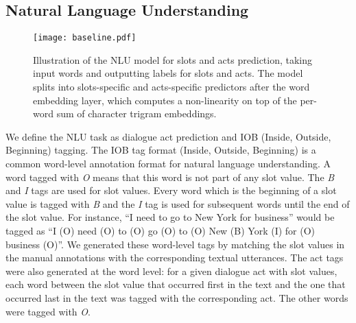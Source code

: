 \documentclass{article}
\theoremstyle{definition}
\begin{document}
\subsection{Natural Language Understanding}
\label{baseline}
\begin{figure}[!h]
\centering
\texttt{[image: baseline.pdf]}
\caption{Illustration of the NLU model for slots and acts prediction, taking input words and outputting labels for slots and acts. The model splits into slots-specific and acts-specific predictors after the word embedding layer, which computes a non-linearity on top of the per-word sum of character trigram embeddings.
\label{fig:baseline}}
\end{figure}
%

We define the NLU task as dialogue act prediction and IOB (Inside, Outside, Beginning) tagging. The IOB tag format (Inside, Outside, Beginning) is a common word-level annotation format for natural language understanding. A word tagged with \emph{O} means that this word is not part of any slot value. The \emph{B} and \emph{I} tags are used for slot values. Every word which is the beginning of a slot value is tagged with \emph{B} and the \emph{I} tag is used for subsequent words until the end of the slot value. For instance, ``I need to go to New York for business'' would be tagged as ``I (O) need (O) to (O) go (O) to (O) New (B) York (I) for (O) business (O)''. We generated these word-level tags by matching the slot values in the manual annotations with the corresponding textual utterances. The act tags were also generated at the word level: for a given dialogue act with slot values, each word between the slot value that occurred first in the text and the one that occurred last in the text was tagged with the corresponding act. The other words were tagged with \emph{O}.
\end{document}
